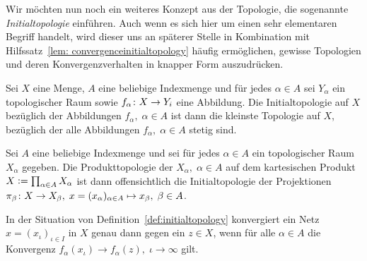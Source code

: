 \documentclass[../main/main.tex]{subfiles}
\begin{document}
	
	Wir möchten nun noch ein weiteres Konzept aus der Topologie, die sogenannte \emph{Initialtopologie} einführen.
	Auch wenn es sich hier um einen sehr elementaren Begriff handelt, wird dieser uns an späterer Stelle 
	in Kombination mit Hilfssatz~\ref{lem: convergenceinitialtopology} häufig ermöglichen, 
	gewisse Topologien und deren Konvergenzverhalten in knapper Form auszudrücken.
	
	\begin{Definition}[Initialtopologie]
		\label{def:initialtopology}
		Sei $X$ eine Menge, $A$ eine beliebige Indexmenge und für jedes $\alpha \in A$ sei $Y_\alpha$ ein topologischer Raum sowie $f_\alpha \colon X \to Y_i$ eine Abbildung.
		Die Initialtopologie auf $X$ bezüglich der Abbildungen $f_\alpha, \; \alpha \in A$ ist dann die kleinste Topologie auf $X$, bezüglich der alle Abbildungen 
		$f_\alpha, \; \alpha \in A$ stetig sind.
	\end{Definition}

	\begin{Bemerkung}[Produkttopologie]
		Sei $A$ eine beliebige Indexmenge und sei für jedes $\alpha \in A$ ein topologischer Raum $X_\alpha$ gegeben. Die Produkttopologie der $X_\alpha, \; \alpha \in A$
		auf dem kartesischen Produkt $X \vcentcolon = \prod_{\alpha \in A} X_\alpha$ ist dann offensichtlich die Initialtopologie der Projektionen 
		$\pi_\beta \colon X \to X_\beta, \; x = (x_\alpha)_{\alpha \in A} \mapsto x_\beta , \; \beta \in A$.
	\end{Bemerkung}
	
	\begin{Hilfssatz}
		\label{lem: convergenceinitialtopology}
		In der Situation von Definition~\ref{def:initialtopology} konvergiert ein Netz $x = (x_\iota)_{\iota \in I}$ in $X$ genau dann gegen ein $z \in X$, wenn für alle $\alpha \in A$
		die Konvergenz $f_\alpha(x_\iota) \to f_\alpha(z), \; \iota \to \infty$ gilt.
	\end{Hilfssatz}
\end{document}
